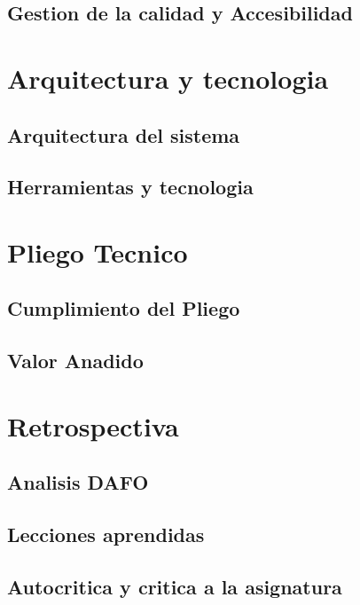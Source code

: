 \documentclass{beamer}
\begin{document}
\subsection{Gestion de la calidad y Accesibilidad}

\section{Arquitectura y tecnologia}

\subsection{Arquitectura del sistema}

\subsection{Herramientas y tecnologia}

\section{Pliego Tecnico}

\subsection{Cumplimiento del Pliego}

\subsection{Valor Anadido}

\section{Retrospectiva}

\subsection{Analisis DAFO}

\subsection{Lecciones aprendidas}

\subsection{Autocritica y critica a la asignatura}
\end{document}
